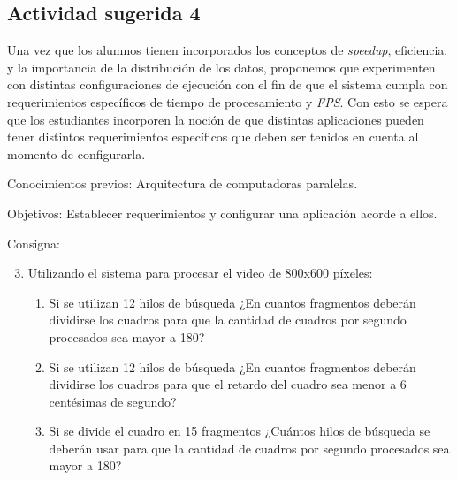 \subsection{Actividad sugerida 4}

Una vez que los alumnos tienen incorporados los conceptos de \emph{speedup},
eficiencia, y la importancia de la distribución de los datos, proponemos que
experimenten con distintas configuraciones de ejecución con el fin de que el
sistema cumpla con requerimientos específicos de tiempo de procesamiento y
\emph{FPS}. Con esto se espera que los estudiantes incorporen la noción de que
distintas aplicaciones pueden tener distintos requerimientos específicos que
deben ser tenidos en cuenta al momento de configurarla.

\begin{description}

	\item{Conocimientos previos}: Arquitectura de computadoras paralelas.

	\item{Objetivos}: Establecer requerimientos y configurar una aplicación
		acorde a ellos.

	\item{Consigna}: \begin{enumerate}

	\setcounter{enumi}{2}

	\item{Utilizando el sistema para procesar el video de 800x600 píxeles:

\begin{enumerate}

	\item{Si se utilizan 12 hilos de búsqueda ¿En cuantos fragmentos deberán
		dividirse los cuadros para que la cantidad de cuadros por
		segundo procesados sea mayor a 180?}

	\item{Si se utilizan 12 hilos de búsqueda ¿En cuantos fragmentos deberán
		dividirse los cuadros para que el retardo del cuadro sea menor a
		6 centésimas de segundo?}

	\item{Si se divide el cuadro en 15 fragmentos ¿Cuántos hilos de búsqueda
		se deberán usar para que la cantidad de cuadros por segundo
		procesados sea mayor a 180?}

\end{enumerate}}

\end{enumerate}

\end{description}

